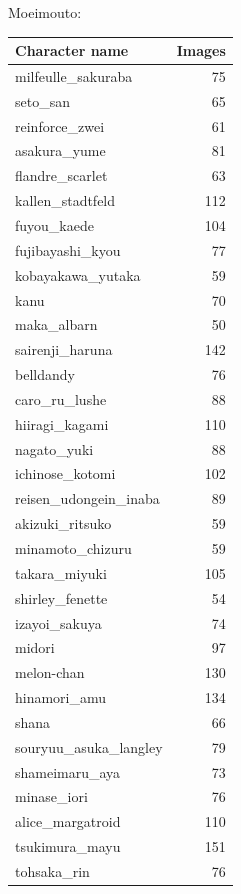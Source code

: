 \documentclass[11.5pt]{article}
\begin{document}
    \noindent Moeimouto: \vspace{3mm}\\
    \begin{supertabular}[h!]{lr}
        Character name & Images \\ \hline
        milfeulle\_sakuraba & 75 \\
        seto\_san & 65 \\
        reinforce\_zwei & 61 \\
        asakura\_yume & 81 \\
        flandre\_scarlet & 63 \\
        kallen\_stadtfeld & 112 \\
        fuyou\_kaede & 104 \\
        fujibayashi\_kyou & 77 \\
        kobayakawa\_yutaka & 59 \\
        kanu & 70 \\
        maka\_albarn & 50 \\
        sairenji\_haruna & 142 \\
        belldandy & 76 \\
        caro\_ru\_lushe & 88 \\
        hiiragi\_kagami & 110 \\
        nagato\_yuki & 88 \\
        ichinose\_kotomi & 102 \\
        reisen\_udongein\_inaba & 89 \\
        akizuki\_ritsuko & 59 \\
        minamoto\_chizuru & 59 \\
        takara\_miyuki & 105 \\
        shirley\_fenette & 54 \\
        izayoi\_sakuya & 74 \\
        midori & 97 \\
        melon-chan & 130 \\
        hinamori\_amu & 134 \\
        shana & 66 \\
        souryuu\_asuka\_langley & 79 \\
        shameimaru\_aya & 73 \\
        minase\_iori & 76 \\
        alice\_margatroid & 110 \\
        tsukimura\_mayu & 151 \\
        tohsaka\_rin & 76 \\

\end{supertabular}
\end{document}
